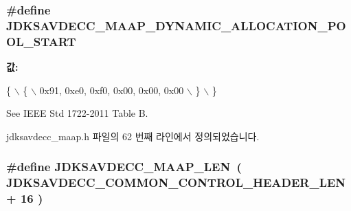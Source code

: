 \subsubsection[{\texorpdfstring{J\+D\+K\+S\+A\+V\+D\+E\+C\+C\+\_\+\+M\+A\+A\+P\+\_\+\+D\+Y\+N\+A\+M\+I\+C\+\_\+\+A\+L\+L\+O\+C\+A\+T\+I\+O\+N\+\_\+\+P\+O\+O\+L\+\_\+\+S\+T\+A\+RT}{JDKSAVDECC_MAAP_DYNAMIC_ALLOCATION_POOL_START}}]{\setlength{\rightskip}{0pt plus 5cm}\#define J\+D\+K\+S\+A\+V\+D\+E\+C\+C\+\_\+\+M\+A\+A\+P\+\_\+\+D\+Y\+N\+A\+M\+I\+C\+\_\+\+A\+L\+L\+O\+C\+A\+T\+I\+O\+N\+\_\+\+P\+O\+O\+L\+\_\+\+S\+T\+A\+RT}\hypertarget{group__maap_ga017f97144722763ab58c54a785161bca}{}\label{group__maap_ga017f97144722763ab58c54a785161bca}
{\bfseries 값\+:}
\begin{DoxyCode}
\{                                                                                                          
                      \(\backslash\)
        \{                                                                                                  
                          \(\backslash\)
            0x91, 0xe0, 0xf0, 0x00, 0x00, 0x00                                                             
                          \(\backslash\)
        \}                                                                                                  
                          \(\backslash\)
    \}
\end{DoxyCode}
See I\+E\+EE Std 1722-\/2011 Table B. 

jdksavdecc\+\_\+maap.\+h 파일의 62 번째 라인에서 정의되었습니다.

\subsubsection[{\texorpdfstring{J\+D\+K\+S\+A\+V\+D\+E\+C\+C\+\_\+\+M\+A\+A\+P\+\_\+\+L\+EN}{JDKSAVDECC_MAAP_LEN}}]{\setlength{\rightskip}{0pt plus 5cm}\#define J\+D\+K\+S\+A\+V\+D\+E\+C\+C\+\_\+\+M\+A\+A\+P\+\_\+\+L\+EN~( {\bf J\+D\+K\+S\+A\+V\+D\+E\+C\+C\+\_\+\+C\+O\+M\+M\+O\+N\+\_\+\+C\+O\+N\+T\+R\+O\+L\+\_\+\+H\+E\+A\+D\+E\+R\+\_\+\+L\+EN} + 16 )}\hypertarget{group__maap_ga554b0e25c8ea77e28e7720dd4662758b}{}\label{group__maap_ga554b0e25c8ea77e28e7720dd4662758b}


